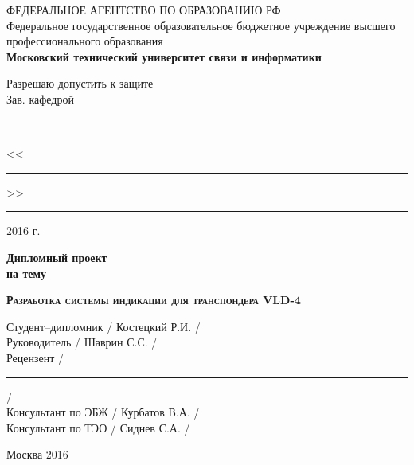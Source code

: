 \begin{titlepage}
  \newpage

  \begin{center}
    ФЕДЕРАЛЬНОЕ АГЕНТСТВО ПО ОБРАЗОВАНИЮ РФ \\
    \vspace{1cm}
    Федеральное государственное образовательное бюджетное учреждение высшего
    профессионального образования\\
    \textbf{Московский технический университет связи и информатики}
  \end{center}

  \vspace{1.5em}

  \hspace{-1cm}\begin{minipage}{0.35\textwidth}
    \begin{center}
      Разрешаю допустить к защите \\
      Зав. кафедрой \\
    \end{center}
    \vspace{-1.0em}
    \rule{\textwidth}{.1pt} \\
    <<\rule{2em}{.1pt}>> \rule{6em}{.1pt} 2016 г.
  \end{minipage}
  \vfill

  \begin{center}
    \Huge\bfseries Дипломный проект \\ на тему
  \end{center}

  \vspace{0.5em}

  \begin{center}
    \textsc{\textbf{\Large Разработка системы индикации для транспондера VLD-4}}
  \end{center}

  \vfill

  \begin{flushleft}
    Студент--дипломник \hrulefill / Костецкий Р.И. / \\
    \vspace{1.5em}
    Руководитель \hrulefill / Шаврин С.С. /\\
    \vspace{1.5em}
    Рецензент \hrulefill  / \rule{6em}{.1pt} /\\
    \vspace{1.5em}
    Консультант по ЭБЖ \hrulefill / Курбатов В.А. /\\
    \vspace{1.5em}
    Консультант по ТЭО \hrulefill / Сиднев С.А. /\\
    \vspace{1.5em}
  \end{flushleft}

  \vspace{\fill}

  \begin{center}
    Москва 2016
  \end{center}

\end{titlepage}